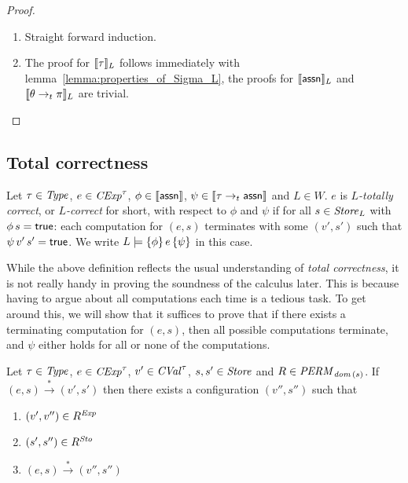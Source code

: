 \documentclass[12pt,a4paper]{report}
\newcommand{\CExp}{\nstyle{CExp}}
\newcommand{\CVal}{\nstyle{CVal}}
\newcommand{\Sto}{\nstyle{Sto}}
\newcommand{\PERM}{\nstyle{PERM}}
\begin{document}
\begin{proof} \
  \begin{enumerate}
    \item Straight forward induction.

    \item The proof for $\llbracket\tau\rrbracket_L$ follows immediately with
          lemma~\ref{lemma:properties_of_Sigma_L}, the proofs for
          $\llbracket\mathsf{assn}\rrbracket_L$ and $\llbracket\theta\rightarrow_t\pi\rrbracket_L$
          are trivial.
  \end{enumerate}
\end{proof}



\subsection{Total correctness}

\begin{definition}
  Let $\tau\in\mathit{Type}$, $e\in\CExp^\tau$, $\phi\in\llbracket\mathsf{assn}\rrbracket$, $\psi\in\llbracket\tau\rightarrow_t\mathsf{assn}\rrbracket$
  and $L\in W$. $e$ is {\em $L$-totally correct}, or {\em $L$-correct} for short, with respect to $\phi$ and
  $\psi$ if for all $s\in\mathit{Store}_L$ with $\phi\,s=\mathsf{true}$: each computation for $(e,s)$ terminates with some
  $(v',s')$ such that $\psi\,v'\,s'=\mathsf{true}$. We write $L \models \{\phi\}\,e\,\{\psi\}$ in this case.
\end{definition}

While the above definition reflects the usual understanding of {\em total correctness}, it is not really handy
in proving the soundness of the calculus later. This is because having to argue about all computations each
time is a tedious task. To get around this, we will show that it suffices to prove that if there exists a
terminating computation for $(e,s)$, then all possible computations terminate, and $\psi$ either holds for all
or none of the computations.

\begin{lemma}
  Let $\tau\in\mathit{Type}$, $e\in\CExp^\tau$, $v'\in\CVal^\tau$, $s,s'\in\mathit{Store}$
  and $R \in \PERM_{\dom{s}}$. If $(e,s)\xrightarrow*(v',s')$ then there
  exists a configuration $(v'',s'')$ such that
  \begin{enumerate}
    \item $(v',v'')\in R^{\mathit{Exp}}$
    \item $(s',s'')\in R^\Sto$
    \item $(e,s) \xrightarrow* (v'',s'')$
  \end{enumerate}
\end{lemma}
\end{document}
